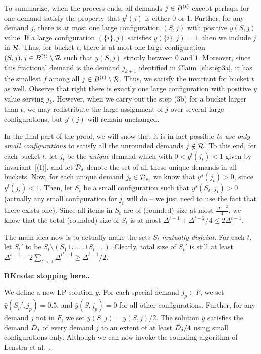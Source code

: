   To summarize, when the process ends, all demands $j \in B^{(t)}$  except perhaps for one demand satisfy the property that $y^l(j)$ is either 0 or 1. Further, for any demand $j$, there is at most one large configuration $(S,j)$ with positive $y(S,j)$ value. If a large configuration $(\{i\},j)$ satisfies $y(\{i\},j)=1$, then we include $j$ in ${\cal R}$. Thus, for bucket $t$, there is at most one large configuration $(S,j), j \in B^{(t)} \setminus {\cal R}$  such that $y(S,j)$ strictly between $0$ and $1$. Moreover, since this fractional demand is the demand $j_{k+1}$ identified in Claim~\ref{cl:step3a}, it has the smallest $f$ among all $j \in B^{(t)} \setminus {\cal R}$. Thus, we satisfy the invariant for bucket $t$ as well. Observe that right there is exactly one large configuration with positive $y$ value serving $j_k$. However, when we carry out the step (3b) for a bucket larger than $t$, we may redistribute the large assignment of $j$ over several large configurations, but $y^l(j)$ will remain unchanged.


\medskip {}
In the final part of the proof, we will snow that it is in fact possible \emph{to use only small configurations} to satisfy all the unrounded demands $j \notin {\cal R}$.
To this end, for each bucket $t$, let $j_t$ be the {\em unique} demand which with $0 < y^l(j_t) < 1$ given by invariant~[(I)], and let ${\cal D}_s$ denote the set of all these unique demands in all buckets. Now, for each unique demand $j_t \in {\cal D}_s$, we know that $y^s(j_t) > 0$, since $y^l(j_t) < 1$. Then, let $S_t$ be a small configuration such that $y^s(S_t,j_t) > 0$ (actually any small configuration for $j_t$ will do -- we just need to use the fact that there exists one). Since all items in $S_t$ are of (rounded) size at most $\frac{\Delta^{t-2}}{4}$, we know that the total (rounded) size of $S_t$ is at most $\Delta^{t-1} + \Delta^{t-2}/4 \leq 2 \Delta^{t-1}$. 

The main idea now is to actually make the sets $S_t$ \emph{mutually disjoint}. For each $t$, let $S_t'$ to be $S_t \setminus (S_1 \cup \ldots \cup S_{t-1})$. Clearly, total size of $S_t'$ is still at least $\Delta^{t-1} - 2\sum_{t' < t} \Delta^{t'-1} \geq \Delta^{t-1}/2$.

{\bf RKnote: stopping here..}

We define a new LP solution ${\bar y}$.
For each special demand $j_p \in F$,
we set ${\bar y}(S_p',j_p) = 0.5$, and ${\bar y}(S,j_p) = 0$ for all other configurations. Further, for any demand $j$ not in $F$, we set ${\bar y}(S,j) =  y(S,j)/2$. The solution ${\bar y}$ satisfies the demand ${\bar D}_j$ of every demand $j$ to an extent of at least ${\bar D}_j/4$ using small configurations only.  Although we can now invoke the rounding algorithm of Lenstra et al.~\cite{}.

